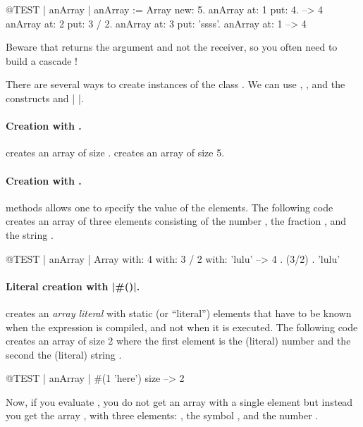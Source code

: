 \documentclass[a4paper,10pt,twoside]{book}
\begin{document}
\begin{code}{@TEST | anArray | }
anArray := Array new: 5.
anArray at: 1 put: 4. --> 4
anArray at: 2 put: 3 / 2.
anArray at: 3 put: 'ssss'.
anArray at: 1 --> 4
\end{code}
\noindent

Beware that  returns the argument and not the receiver, so you often need to build a cascade !

There are several ways to create instances of the class .
We can use , , and  the constructs \ct{#( )} and \ct|{ }|.

\paragraph{Creation with .}  creates an array of size .
 creates an array of size 5.

\paragraph{Creation with .}  methods allows one to specify the value of the elements.
The following code creates an array of three elements consisting of the number , the fraction , and the string .

\begin{code}{@TEST | anArray |}
Array with: 4 with: 3 / 2 with: 'lulu' -->  {4 . (3/2) . 'lulu'}
\end{code}

\paragraph{Literal creation with \ct|\#()|.}
\ct{#()} creates an \emph{array literal} with static (or ``literal'') elements that have to be known when the expression is compiled, and not when it is executed.
The following code creates an array of size 2 where the first element is the (literal) number  and the second the (literal) string .


\begin{code}{@TEST | anArray |}
#(1 'here') size --> 2
\end{code}

Now, if you evaluate , you do not get an array with a single element  but instead you get the array , \ie with three elements: , the symbol \ct{#+}, and the number .
\end{document}

